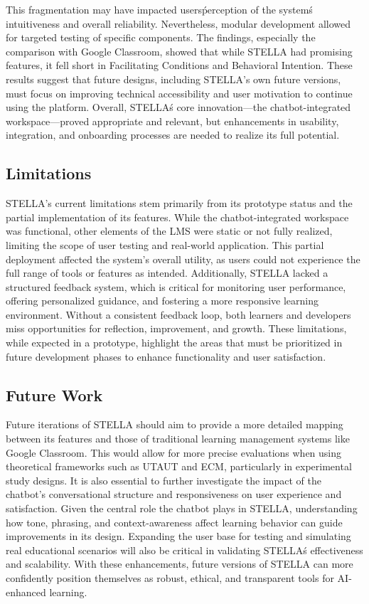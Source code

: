 \documentclass[sigconf,natbib=true]{acmart}
\begin{document}
This fragmentation may have impacted users\' perception of the system\'s intuitiveness and overall reliability. Nevertheless, modular development allowed for targeted testing of specific components. The findings, especially the comparison with Google Classroom, showed that while STELLA had promising features, it fell short in Facilitating Conditions and Behavioral Intention. These results suggest that future designs, including STELLA's own future versions, must focus on improving technical accessibility and user motivation to continue using the platform. Overall, STELLA\'s core innovation—the chatbot-integrated workspace—proved appropriate and relevant, but enhancements in usability, integration, and onboarding processes are needed to realize its full potential.

\subsection{Limitations}
STELLA's current limitations stem primarily from its prototype status and the partial implementation of its features. While the chatbot-integrated workspace was functional, other elements of the LMS were static or not fully realized, limiting the scope of user testing and real-world application. This partial deployment affected the system’s overall utility, as users could not experience the full range of tools or features as intended. Additionally, STELLA lacked a structured feedback system, which is critical for monitoring user performance, offering personalized guidance, and fostering a more responsive learning environment. Without a consistent feedback loop, both learners and developers miss opportunities for reflection, improvement, and growth. These limitations, while expected in a prototype, highlight the areas that must be prioritized in future development phases to enhance functionality and user satisfaction.

\subsection{Future Work}
Future iterations of STELLA should aim to provide a more detailed mapping between its features and those of traditional learning management systems like Google Classroom. This would allow for more precise evaluations when using theoretical frameworks such as UTAUT and ECM, particularly in experimental study designs. It is also essential to further investigate the impact of the chatbot's conversational structure and responsiveness on user experience and satisfaction. Given the central role the chatbot plays in STELLA, understanding how tone, phrasing, and context-awareness affect learning behavior can guide improvements in its design. Expanding the user base for testing and simulating real educational scenarios will also be critical in validating STELLA\'s effectiveness and scalability. With these enhancements, future versions of STELLA can more confidently position themselves as robust, ethical, and transparent tools for AI-enhanced learning.
\end{document}
